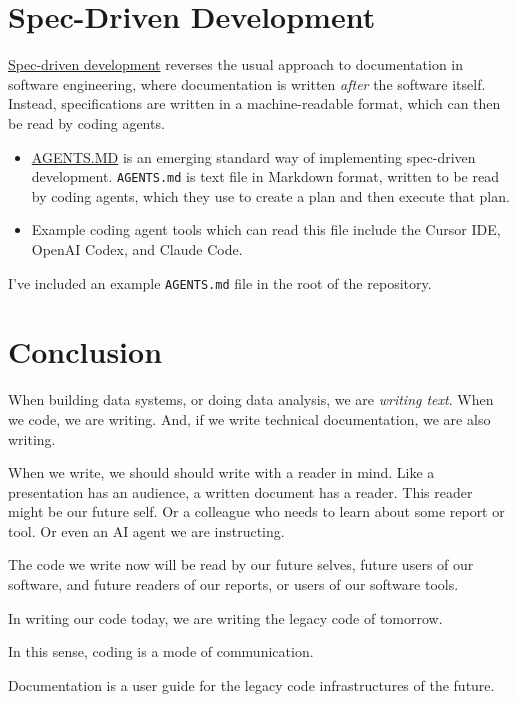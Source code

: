 \documentclass[
  letterpaper,
  DIV=11,
  numbers=noendperiod]{scrartcl}
\begin{document}
\section{Spec-Driven Development}\label{spec-driven-development}

\href{https://en.wikipedia.org/wiki/Spec-driven_development}{Spec-driven
development} reverses the usual approach to documentation in software
engineering, where documentation is written \emph{after} the software
itself. Instead, specifications are written in a machine-readable
format, which can then be read by coding agents.

\begin{itemize}
\item
  \href{https://agents.md/}{AGENTS.MD} is an emerging standard way of
  implementing spec-driven development. \texttt{AGENTS.md} is text file
  in Markdown format, written to be read by coding agents, which they
  use to create a plan and then execute that plan.
\item
  Example coding agent tools which can read this file include the Cursor
  IDE, OpenAI Codex, and Claude Code.
\end{itemize}

I've included an example \texttt{AGENTS.md} file in the root of the
repository.

\section{Conclusion}\label{conclusion}

When building data systems, or doing data analysis, we are \emph{writing
text}. When we code, we are writing. And, if we write technical
documentation, we are also writing.

When we write, we should should write with a reader in mind. Like a
presentation has an audience, a written document has a reader. This
reader might be our future self. Or a colleague who needs to learn about
some report or tool. Or even an AI agent we are instructing.

The code we write now will be read by our future selves, future users of
our software, and future readers of our reports, or users of our
software tools.

In writing our code today, we are writing the legacy code of tomorrow.

In this sense, coding is a mode of communication.

Documentation is a user guide for the legacy code infrastructures of the
future.
\end{document}
